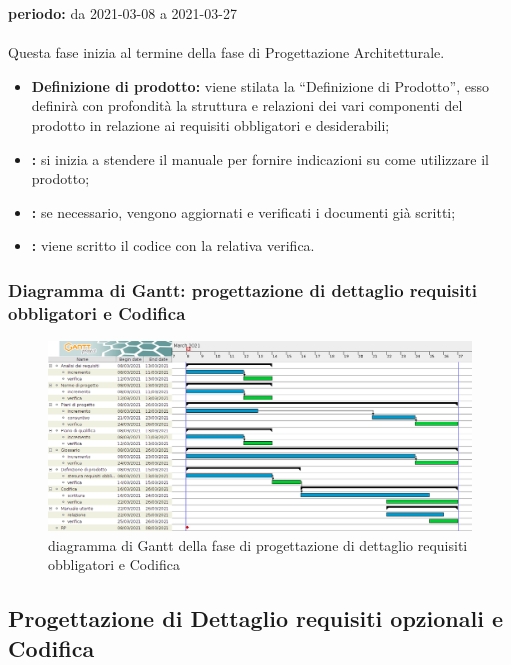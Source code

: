 	\textbf{periodo:} da 2021-03-08 a 2021-03-27 
	\\
	\\
	Questa fase inizia al termine della fase di Progettazione Architetturale.
	\begin{itemize}
		\item \textbf{Definizione di prodotto:} viene stilata la “Definizione di Prodotto”, esso definirà con profondità la struttura e relazioni dei vari componenti del prodotto in relazione ai requisiti obbligatori e desiderabili;
		\item \textbf{:} si inizia a stendere il manuale per fornire indicazioni su come utilizzare il prodotto;
		\item \textbf{:} se necessario, vengono aggiornati e verificati i documenti già scritti;
		\item \textbf{:} viene scritto il codice con la relativa verifica.
	\end{itemize}  

	\subsubsection{Diagramma di Gantt: progettazione di dettaglio requisiti obbligatori e Codifica}

		\begin{figure}[H]
			\centering
			\includegraphics[width=1\linewidth]{./res/images/Obbligatori.png}
			\caption{diagramma di Gantt della fase di progettazione di dettaglio requisiti obbligatori e Codifica}
			\label{fig:diagramma di Gantt della fase di progettazione di dettaglio requisiti obbligatori e Codifica}
		\end{figure}
	
	
\subsection{Progettazione di Dettaglio requisiti opzionali e Codifica}

